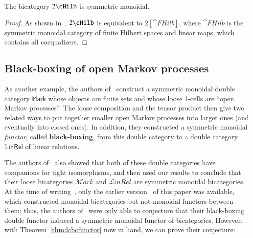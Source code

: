 \begin{cor}
The bicategory $2\cHilb$ is symmetric monoidal.
\end{cor}

\begin{proof}
As shown in~\cite[Section 3.6.3]{westerthesis}, $2\cHilb$ is equivalent to $2[\cat{FHilb}]$, where $\cat{FHilb}$ is the symmetric monoidal category of finite Hilbert spaces and linear maps, which contains all coequalizers.
\end{proof}

\subsection{Black-boxing of open Markov processes}
\label{sec:markov}

As another example, the authors of~\cite{bc:markov} construct a symmetric monoidal double category $\mathbb{M}\mathsf{ark}$ whose objects are finite sets and whose loose 1-cells are ``open Markov processes''.
The loose composition and the tensor product then give two related ways to put together smaller open Markov processes into larger ones (and eventually into closed ones).
In addition, they constructed a symmetric monoidal \emph{functor}, called \textbf{black-boxing}, from this double category to a double category $\mathbb{L}\mathsf{inRel}$ of linear relations.

The authors of~\cite{bc:markov} also showed that both of these double categories have companions for tight isomorphisms, and then used our results to conclude that their loose bicategories $\mathcal{M}\mathit{ark}$ and $\mathcal{L}\mathit{inRel}$ are symmetric monoidal bicategories.
At the time of writing~\cite{bc:markov}, only the earlier version~\cite{shulman:smbicat} of this paper was available, which constructed monoidal bicategories but not monoidal functors between them; thus, the authors of~\cite{bc:markov} were only able to conjecture that their black-boxing double functor induced a symmetric monoidal functor of bicategories.
However, with Theorem~\ref{thm:lcbcfunctor} now in hand, we can prove their conjecture:

